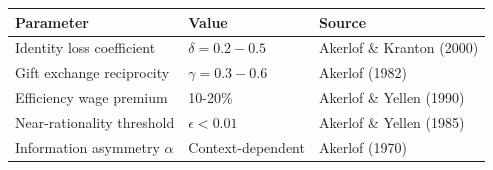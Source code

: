 \begin{tcolorbox}[colback=yellow!10!white, colframe=orange!75!black, title=Quick Reference: Key Akerlof Parameters]
\begin{tabular}{lll}
\textbf{Parameter} & \textbf{Value} & \textbf{Source} \\
\hline
Identity loss coefficient & $\delta = 0.2-0.5$ & Akerlof \& Kranton (2000) \\
Gift exchange reciprocity & $\gamma = 0.3-0.6$ & Akerlof (1982) \\
Efficiency wage premium & 10-20\% & Akerlof \& Yellen (1990) \\
Near-rationality threshold & $\epsilon < 0.01$ & Akerlof \& Yellen (1985) \\
Information asymmetry $\alpha$ & Context-dependent & Akerlof (1970) \\
\end{tabular}
\end{tcolorbox}



